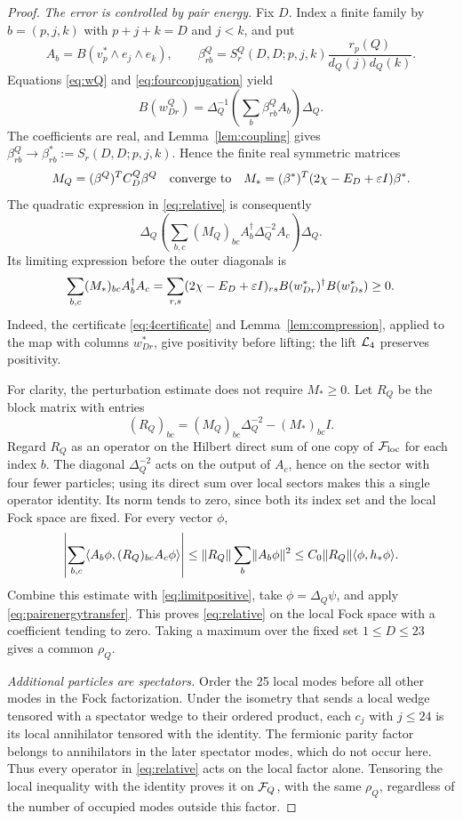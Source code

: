 \begin{proof}
\emph{The error is controlled by pair energy.}
Fix $D$.  Index a finite family by
$b=(p,j,k)$ with $p+j+k=D$ and $j<k$, and put
\[
 A_b=B(v_p^*\wedge e_j\wedge e_k),\qquad
 \beta_{rb}^Q=S_r^Q(D,D;p,j,k)
                \frac{r_p(Q)}{d_Q(j)d_Q(k)}.
\]
Equations \eqref{eq:wQ} and \eqref{eq:fourconjugation} yield
\[
 B(w_{Dr}^Q)=\Delta_Q^{-1}
             \left(\sum_b\beta_{rb}^QA_b\right)\Delta_Q.
\]
The coefficients are real, and Lemma~\ref{lem:coupling} gives
$\beta_{rb}^Q\to\beta_{rb}^*:=S_r(D,D;p,j,k)$.  Hence the finite
real symmetric matrices
\[
 M_Q=(\beta^Q)^TC_D^Q\beta^Q
 \quad\hbox{converge to}\quad
 M_*=(\beta^*)^T(2\chi-E_D+\varepsilon I)\beta^*.
\]
The quadratic expression in \eqref{eq:relative} is consequently
\[
 \Delta_Q\left(\sum_{b,c}(M_Q)_{bc}
                 A_b^\dagger\Delta_Q^{-2}A_c\right)\Delta_Q.
\]
Its limiting expression before the outer diagonals is
\begin{equation}\label{eq:limitpositive}
 \sum_{b,c}(M_*)_{bc}A_b^\dagger A_c
 =\sum_{r,s}(2\chi-E_D+\varepsilon I)_{rs}
       B(w_{Dr}^*)^\dagger B(w_{Ds}^*)\ge0.
\end{equation}
Indeed, the certificate \eqref{eq:4certificate} and
Lemma~\ref{lem:compression}, applied to the map with columns $w_{Dr}^*$,
give positivity before lifting; the lift $\mathcal L_4$ preserves positivity.

For clarity, the perturbation estimate does not require $M_*\ge0$.
Let $R_Q$ be the block matrix with entries
\[
 (R_Q)_{bc}=(M_Q)_{bc}\Delta_Q^{-2}-(M_*)_{bc}I.
\]
Regard $R_Q$ as an operator on the Hilbert direct sum of one copy of
$\mathcal F_{\mathrm{loc}}$ for each index $b$.  The diagonal $\Delta_Q^{-2}$
acts on the output of $A_c$, hence on the sector with four fewer particles;
using its direct sum over local sectors makes this a single operator
identity. Its norm tends to zero, since both its index set and the local
Fock space are fixed. For every vector $\phi$,
\[
 \left|\sum_{b,c}\langle A_b\phi,(R_Q)_{bc}A_c\phi\rangle\right|
 \le\lVert R_Q\rVert\sum_b\lVert A_b\phi\rVert^2
 \le C_0\lVert R_Q\rVert\langle \phi,h_*\phi\rangle.
\]
Combine this estimate with \eqref{eq:limitpositive}, take
$\phi=\Delta_Q\psi$, and apply \eqref{eq:pairenergytransfer}.  This
proves \eqref{eq:relative} on the local Fock space with a coefficient
tending to zero.  Taking a maximum over the fixed set $1\le D\le23$
gives a common $\rho_Q$.

\emph{Additional particles are spectators.}
Order the 25 local modes before all other modes in the Fock
factorization.  Under the isometry that sends a local wedge tensored with a spectator
wedge to their ordered product, each $c_j$ with $j\le24$ is its local
annihilator tensored with the identity. The fermionic parity factor belongs
to annihilators in the later spectator modes, which do not occur here.
Thus every operator in \eqref{eq:relative} acts on the local factor alone.
Tensoring the local inequality with the identity proves
it on $\mathcal F_Q$, with the same $\rho_Q$, regardless of the number of
occupied modes outside this factor.
\end{proof}

